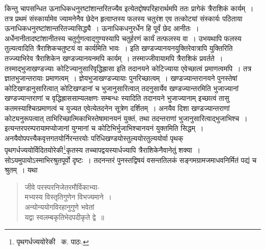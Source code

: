\documentclass[11pt, openany]{book}
\begin{document}
\noindent किन्तु चापसन्धित ऊनाधिकधनुरष्टांशान्तरितज्यैव इत्येतद्दोषपरिहारार्थमपि ततः प्रागेकं त्रैराशिकं कार्यम्~। तत्र प्रथमं संस्कार्यामेव ज्यामनेनैव छेदेन हृत्वाप्तस्य फलस्य चतुरंश एव तत्कोट्यां संस्कार्यः पठिताया ऊनाधिकधनुरष्टांशान्तरितज्यासिद्ध्यै~। ऊनाधिकधनुरर्धेन हि पूर्वं छेद आनीतः~। अर्धेनानीतादष्टांशानीतस्य चतुर्गुणत्वाद्गुण्यस्यापि चतुर्हरणं कार्यं तत्फलस्य वा~। उभयथापि फलस्य तुल्यत्वादिति त्रैराशिकचतुष्टयं वा कार्यमिति भावः~। इति खण्डज्यानयनयुक्तिरेवात्रापि युक्तिरिति तज्ज्याभिरेव त्रैराशिकेन खण्डज्यानयनमपि कार्यम्~। तस्माज्जीवायामपि त्रैराशिकं प्रवर्तते~। तस्माद्भुजाखण्डज्याः कोटिज्यानुसारिवृद्धिह्रासा इति तदानयने कोटिज्याया एवेच्छात्वं प्रमाणत्वमपि~। तत्र ज्ञातभुजान्तरायाः
प्रमाणत्वम्~। ज्ञेयभुजाखण्डज्यायाः पुनरिच्छात्वम्~। खण्डज्यान्तरानयने पुनस्तेषां कोटिखण्डानुसारित्वात् कोटिखण्डानां च भुजानुसारित्वात् तदनुसार्येव खण्डज्यान्तरमिति भुजाज्यानां खण्डज्यान्तराणां च वृद्धिह्राससाम्यलक्षणः सम्बन्धः स्यादिति तदानयने भुजाज्यानाम् इच्छात्वं तासु कतमस्याश्चित्प्रमाणत्वं च युज्यत एवेत्येतदनेन सूत्रेण दर्शितम्~। अनयैव दिशा खण्डज्यान्तराणां कोट्यनुरूपत्वात् ताभिरिच्छात्मिकाभिस्तेषामानयनं युक्तं, तथा तदन्तराणां भुजानुसारित्वाद्भुजाभिश्च~। इत्यन्तरपरम्परायामप्योजानां युग्मानां च कोटिभिर्भुजाभिश्चानयनं युक्तमिति सिद्धम्~। अनयैवोपपत्त्यैकवृत्तगतयोर्निरन्तरयोः परिधिखण्डयोस्तुल्ययोरतुल्ययोर्वा पृथक् पृथगर्धज्ययोर्विदितयोरेकी\renewcommand{\thefootnote}{१}\footnote{पृथगर्धज्ययोरेकी \textendash\ क. पाठः.}कृतस्य तच्चापद्वयस्यार्धज्यापि त्रैराशिकेनैवानेतुं शक्या~। सोऽयमुपायोऽस्माभिरश्रुतपूर्वो दृष्टः~। तदनन्तरं पुनस्तद्विषयं वसन्ततिलकं सङ्गमग्रामजमाधवनिर्मितं पद्यं च श्रुतम्~। यथा\textendash

\begin{quote}
{\qt जीवे परस्परनिजेतरमौर्विकाभ्या-\\
मभ्यस्य विस्तृतिगुणेन विभज्यमाने~।\\
अन्योन्ययोगविरहानुगुणे भवेतां\\
यद्वा स्वलम्बकृतिभेदपदीकृते द्वे~॥}
\end{quote}

\newpage
\end{document}
